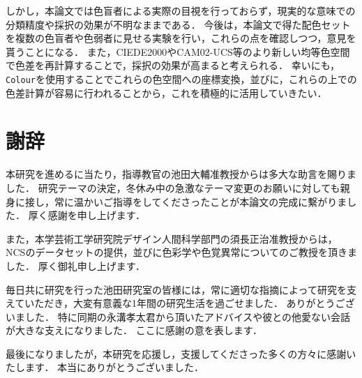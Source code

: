 \documentclass[uplatex,paper=a4,fontsize=4.0truemm,jafontsize=4.0truemm,head_space=30.0truemm,foot_space=30.0truemm,baselineskip=8.0truemm,line_length=40zw,gutter=25.0truemm,oneside,openany,fleqn,hanging_panctuation,open_bracket_pos=nibu_tentsuki,dvipdfmx,jis2004,book,titlepage]{jlreq}
\theoremstyle{mystyle}
\begin{document}
		しかし，本論文では色盲者による実際の目視を行っておらず，現実的な意味での分類精度や採択の効果が不明なままである．
		今後は，本論文で得た配色セットを複数の色盲者や色弱者に見せる実験を行い，これらの点を確認しつつ，意見を貰うことになる．
		また，CIEDE2000やCAM02-UCS等のより新しい均等色空間で色差を再計算することで，採択の効果が高まると考えられる．
		幸いにも，\texttt{Colour}を使用することでこれらの色空間への座標変換，並びに，これらの上での色差計算が容易に行われることから，これを積極的に活用していきたい．
	\chapter*{謝辞}
		本研究を進めるに当たり，指導教官の池田大輔准教授からは多大な助言を賜りました．
		研究テーマの決定，冬休み中の急激なテーマ変更のお願いに対しても親身に接し，常に温かいご指導をしてくださったことが本論文の完成に繫がりました．
		厚く感謝を申し上げます．

		また，本学芸術工学研究院デザイン人間科学部門の須長正治准教授からは，NCSのデータセットの提供，並びに色彩学や色覚異常についてのご教授を頂きました．
		厚く御礼申し上げます．

		毎日共に研究を行った池田研究室の皆様には，常に適切な指摘によって研究を支えていただき，大変有意義な1年間の研究生活を過ごせました．
		ありがとうございました．
		特に同期の永溝孝太君から頂いたアドバイスや彼との他愛ない会話が大きな支えになりました．
		ここに感謝の意を表します．

		最後になりましたが，本研究を応援し，支援してくださった多くの方々に感謝いたします．
		本当にありがとうございました．
	\clearpage
	
	
\end{document}
